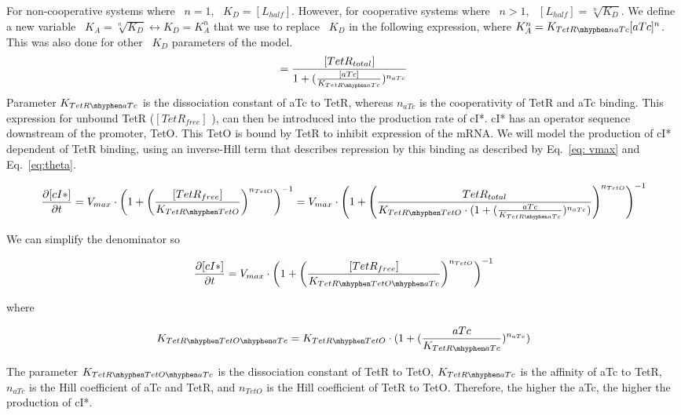 For non-cooperative systems where ~$n=1$, ~$K_{D}=[L_{half}]$.
However, for cooperative systems where ~$n>1$, ~$[L_{half}] = \sqrt[n]{K_{D}}$.
We define a new variable ~$K_{A} = \sqrt[n]{K_{D}} \leftrightarrow K_{D} = K^n_{A}$
that we use to replace ~$K_{D}$ in the following expression,
where $K^n_{A} = K_{TetR \mhyphen naTc}{[aTc]^n}$.
This was also done for other ~$K_{D}$ parameters of the model. 
\begin{equation}
[TetR_{free}] =  \frac{[TetR_{total}]}{1+(\frac{[aTc]}{K_{TetR \mhyphen aTc}})^{n_{aTc}}}
\end{equation}
Parameter $K_{TetR \mhyphen aTc}$ is the dissociation constant of aTc to TetR,
whereas $n_{aTc}$ is the cooperativity of TetR and aTc binding.
This expression for unbound TetR ($[TetR_{free}]$ ), can then be introduced into the production rate of cI*.
cI* has an operator sequence downstream of the promoter, TetO.
This TetO is bound by TetR to inhibit expression of the mRNA.
We will model the production of cI* dependent of TetR binding,
using an inverse-Hill term
that describes repression by this binding as described by Eq.~\ref{eq: vmax} and Eq.~\ref{eq:theta}.

\begin{equation}
    \pdv{[cI*]}{t} = V_{max}\cdot \left(1+\left(\frac{[TetR_{free}]}{K_{TetR \mhyphen TetO}}\right)^{n_{TetO}}\right)^{-1} = V_{max} \cdot \left(1+\left(\frac{TetR_{total}}{K_{TetR \mhyphen TetO}\cdot(1+(\frac{aTc}{K_{TetR \mhyphen aTc}})^{n_{aTc}})}\right)^{n_{TetO}}\right)^{-1}
\end{equation}

We can simplify the denominator so

\begin{equation}
    \pdv{[cI*]}{t} = V_{max}\cdot \left(1+\left(\frac{[TetR_{free}]}{K_{TetR \mhyphen TetO \mhyphen aTc }}\right)^{n_{TetO}}\right)^{-1}
\end{equation}

where

\begin{equation}
    K_{TetR \mhyphen TetO \mhyphen aTc }=K_{TetR \mhyphen TetO}\cdot(1+(\frac{aTc}{K_{TetR \mhyphen aTc}})^{n_{aTc}})
\end{equation}

The parameter $K_{TetR \mhyphen TetO \mhyphen aTc }$ is the dissociation constant of TetR to TetO, $K_{TetR \mhyphen aTc}$
is the affinity of aTc to TetR, $n_{aTc}$ is the Hill coefficient of aTc and TetR,
and $n_{TetO}$ is the Hill coefficient of TetR to TetO.
Therefore, the higher the aTc, the higher the production of cI*.

